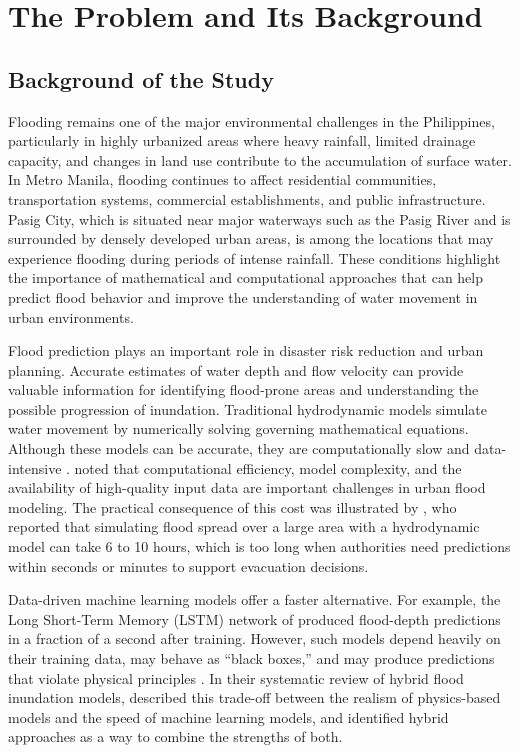 \chapter{The Problem and Its Background}

\label{chap:introduction}

\section{Background of the Study}

Flooding remains one of the major environmental challenges in the Philippines, particularly in highly urbanized areas where heavy rainfall, limited drainage capacity, and changes in land use contribute to the accumulation of surface water. In Metro Manila, flooding continues to affect residential communities, transportation systems, commercial establishments, and public infrastructure. Pasig City, which is situated near major waterways such as the Pasig River and is surrounded by densely developed urban areas, is among the locations that may experience flooding during periods of intense rainfall. These conditions highlight the importance of mathematical and computational approaches that can help predict flood behavior and improve the understanding of water movement in urban environments.

Flood prediction plays an important role in disaster risk reduction and urban planning. Accurate estimates of water depth and flow velocity can provide valuable information for identifying flood-prone areas and understanding the possible progression of inundation. Traditional hydrodynamic models simulate water movement by numerically solving governing mathematical equations. Although these models can be accurate, they are computationally slow and data-intensive \cite{liu2026}.  noted that computational efficiency, model complexity, and the availability of high-quality input data are important challenges in urban flood modeling. The practical consequence of this cost was illustrated by , who reported that simulating flood spread over a large area with a hydrodynamic model can take 6 to 10 hours, which is too long when authorities need predictions within seconds or minutes to support evacuation decisions.

Data-driven machine learning models offer a faster alternative. For example, the Long Short-Term Memory (LSTM) network of  produced flood-depth predictions in a fraction of a second after training. However, such models depend heavily on their training data, may behave as ``black boxes,'' and may produce predictions that violate physical principles \cite{liu2026,hybridreview2026}. In their systematic review of hybrid flood inundation models,  described this trade-off between the realism of physics-based models and the speed of machine learning models, and identified hybrid approaches as a way to combine the strengths of both.

